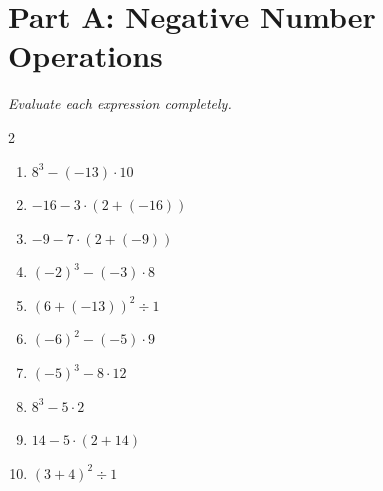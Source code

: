 \documentclass[11pt]{article}
\begin{document}
\section*{Part A: Negative Number Operations}
\noindent\textit{Evaluate each expression completely.}
\begin{multicols}{2}
\begin{enumerate}
  \item $8^{3} - (-13) \cdot 10$
  \vspace{1.1cm}
  \item $-16 - 3 \cdot (2 + (-16))$
  \vspace{1.1cm}
  \item $-9 - 7 \cdot (2 + (-9))$
  \vspace{1.1cm}
  \item $(-2)^{3} - (-3) \cdot 8$
  \vspace{1.1cm}
  \item $(6 + (-13))^{2} \div 1$
  \vspace{1.1cm}
  \item $(-6)^{2} - (-5) \cdot 9$
  \vspace{1.1cm}
  \item $(-5)^{3} - 8 \cdot 12$
  \vspace{1.1cm}
  \item $8^{3} - 5 \cdot 2$
  \vspace{1.1cm}
  \item $14 - 5 \cdot (2 + 14)$
  \vspace{1.1cm}
  \item $(3 + 4)^{2} \div 1$
  \vspace{1.1cm}
\end{enumerate}
\end{multicols}
\end{document}
